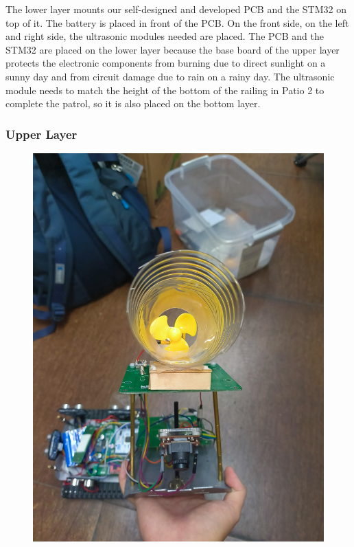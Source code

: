 \documentclass[12pt, a4paper, oneside]{report}
\begin{document}
The lower layer mounts our self-designed and developed PCB and the STM32 on top of it. The battery is placed in front of the PCB. On the front side, on the left and right side, the ultrasonic modules needed are placed. The PCB and the STM32 are placed on the lower layer because the base board of the upper layer protects the electronic components from burning due to direct sunlight on a sunny day and from circuit damage due to rain on a rainy day. The ultrasonic module needs to match the height of the bottom of the railing in Patio 2 to complete the patrol, so it is also placed on the bottom layer.

    \subsubsection*{Upper Layer}
\begin{figure}[H]
  \centering
  \begin{minipage}[t]{0.48\textwidth}
    \centering
    \includegraphics[width=\textwidth,height=0.38\textheight]{pic/Hardware Design/Upper Layer Front View.jpg}

\end{minipage}
\end{figure}
\end{document}
